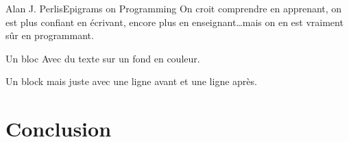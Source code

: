 \begin{epigraphe}{Alan J. Perlis}{Epigrams on Programming}
  On croit comprendre en apprenant, on est plus confiant en écrivant, encore plus en enseignant\dots mais on en est vraiment sûr en programmant.
\end{epigraphe}

\begin{block}{Un bloc}
  Avec du texte sur un fond en couleur.
\end{block}

\begin{block-line}
Un block mais juste avec une ligne avant et une ligne après.\\
\end{block-line}

\section{Conclusion}
